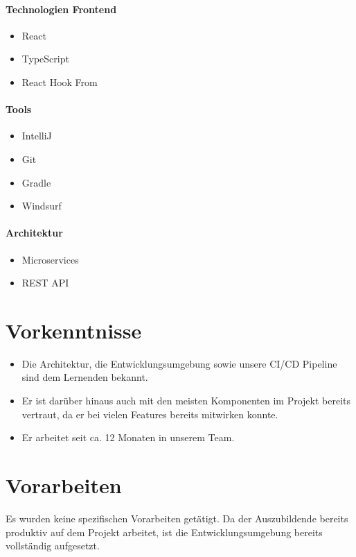 \paragraph{Technologien Frontend}
\begin{itemize}
    \item React
    \item TypeScript
    \item React Hook From
\end{itemize}

\paragraph{Tools}
\begin{itemize}
    \item IntelliJ
    \item Git
    \item Gradle
    \item Windsurf
\end{itemize}

\paragraph{Architektur}
\begin{itemize}
    \item Microservices
    \item REST API
\end{itemize}


\section{Vorkenntnisse}\label{sec:vorkenntnisse}
\begin{itemize}
    \item Die Architektur, die Entwicklungsumgebung sowie unsere CI/CD Pipeline sind dem Lernenden bekannt.
    \item Er ist darüber hinaus auch mit den meisten Komponenten im Projekt bereits vertraut, da er bei vielen Features bereits mitwirken konnte.
    \item Er arbeitet seit ca. 12 Monaten in unserem Team.
\end{itemize}


\section{Vorarbeiten}\label{sec:vorarbeiten}
Es wurden keine spezifischen Vorarbeiten getätigt.
Da der Auszubildende bereits produktiv auf dem Projekt arbeitet, ist die Entwicklungsumgebung bereits vollständig aufgesetzt.

